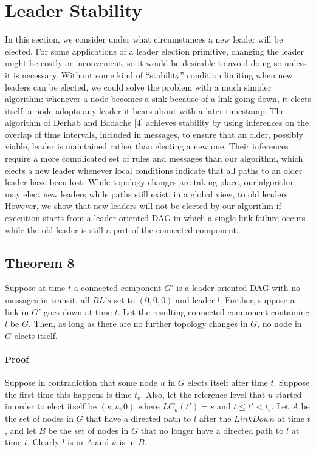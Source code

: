 \documentclass{article}
\begin{document}
\section{Leader Stability}
In this section, we consider under what circumstances a new leader will be elected. For some applications of a leader election primitive, changing the leader might be costly or inconvenient, so it would be desirable to avoid doing so unless it is necessary. Without some kind of “stability” condition limiting when new leaders can be elected, we could solve the problem with a much simpler algorithm: whenever a node becomes a sink because of a link going down, it elects itself; a node adopts any leader it hears about with a later timestamp.
The algorithm of Derhab and Badache [4] achieves stability by using inferences on the overlap of time intervals, included in messages, to ensure that an older, possibly viable, leader is maintained rather than electing a new one. Their inferences require a more complicated set of rules and messages than our algorithm, which elects a new leader whenever local conditions indicate that all paths to an older leader have been lost. While topology changes are taking place, our algorithm may elect new leaders while paths still exist, in a global view, to old leaders. However, we show that new leaders will not be elected by our algorithm if execution starts from a leader-oriented DAG in which a single link failure occurs while the old leader is still a part of the connected component.

\subsection{Theorem 8}
Suppose at time $t$ a connected component $G'$ is a leader-oriented DAG with no messages in transit, all $RL’s$
set to $(0, 0, 0)$ and leader $l$. Further, suppose a link in $G'$ goes down at time $t$. Let the resulting connected component containing $l$ be $G$. Then, as long as there are no further topology changes in $G$, no node in $G$ elects itself.

\paragraph{Proof}
Suppose in contradiction that some node $u$ in $G$ elects itself after time $t$. Suppose the first time this happens is time $t_e$. Also, let the reference level that $u$ started in order to elect itself be $(s, u, 0)$ where $LC_u (t') = s$ and $t \leq t' < t_e$.
Let $A$ be the set of nodes in $G$ that have a directed path to $l$ after the $LinkDown$ at time $t$, and let $B$ be the set of nodes in $G$ that no longer have a directed path to $l$ at time $t$. Clearly $l$ is in $A$ and $u$ is in $B$.
\end{document}
